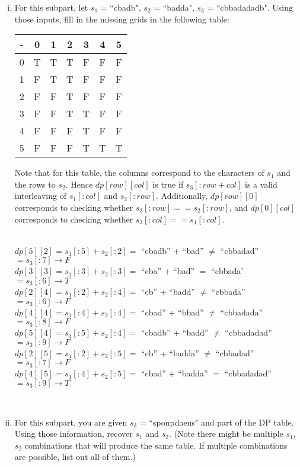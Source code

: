 \documentclass[11pt]{article}
\begin{document}
\begin{enumerate}[(a)]
    \begin{enumerate}[(i)]
        \item For this subpart, let $s_1$ = ``cbadb", $s_2$ = ``badda", $s_3$ = ``cbbadadadb". Using those inputs, fill in the missing grids in the following table:
        \begin{center}
        \begin{tabular}{ |c|c|c|c|c|c|c| } 
        \hline
        - & 0 & 1 & 2 & 3 & 4 & 5 \\ 
        \hline
        0 & T & T & T & F & F & F\\ 
        \hline
        1 & F & T & T & F & F & F \\ 
        \hline
        2 & F & F & T & F & F & \color{blue}F \\ 
        \hline
        3 & F & F & T & \color{blue}T & F & F \\ 
        \hline
        4 & F & F & \color{blue}F & T & \color{blue}F & \color{blue}F \\  
        \hline
        5 & F & F & \color{blue}F & T & \color{blue}T & T \\ 
        \hline
        \end{tabular}
        \end{center}
        Note that for this table, the columns correspond to the characters of $s_1$ and the rows to $s_2$. Hence $dp[row][col]$ is true if $s_3[:row + col]$ is a valid interleaving of $s_1[:col]$ and $s_2[:row]$. Additionally, $dp[row][0]$ corresponds to checking whether $s_3[:row] == s_2[:row]$, and $dp[0][col]$ corresponds to checking whether $s_3[:col] == s_1[:col]$.\\
        \begin{solution}\\
            $dp[5][2] = s_1[:5] + s_2[:2] = $ ``cbadb'' + ``bad'' $\ne$ ``cbbadad'' $ = s_3[:7] \rightarrow F$\\
            $dp[3][3] = s_1[:3] + s_2[:3] = $ ``cba'' + ``bad'' $=$ ``cbbada' $ = s_3[:6] \rightarrow T$\\
            $dp[2][4] = s_1[:2] + s_2[:4] = $ ``cb'' + ``badd'' $\ne$ ``cbbada'' $ = s_3[:6] \rightarrow F$\\
            $dp[4][4] = s_1[:4] + s_2[:4] = $ ``cbad'' + ``bbad'' $\ne$ ``cbbadada'' $ = s_3[:8] \rightarrow F$\\
            $dp[5][4] = s_1[:5] + s_2[:4] = $ ``cbadb'' + ``badd'' $\ne$ ``cbbadadad'' $ = s_3[:9] \rightarrow F$\\
            $dp[2][5] = s_1[:2] + s_2[:5] = $ ``cb'' + ``badda'' $\ne$ ``cbbadad'' $ = s_3[:7] \rightarrow F$\\
            $dp[4][5] = s_1[:4] + s_2[:5] = $ ``cbad'' + ``badda'' $=$ ``cbbadadad'' $ = s_3[:9] \rightarrow T$
        \end{solution}\\
        \item For this subpart, you are given $s_3$ = ``sponpdaens" and part of the DP table. Using those information, recover $s_1$ and $s_2$. (Note there might be multiple $s_1$, $s_2$ combinations that will produce the same table. If multiple combinations are possible, list out all of them.)


\end{enumerate}
\end{enumerate}
\end{document}
